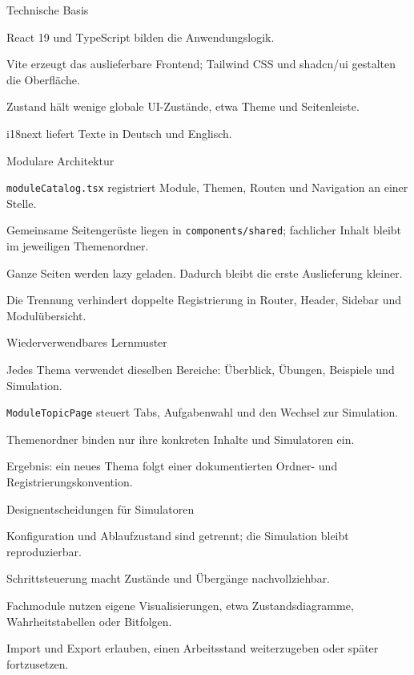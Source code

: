 
\begin{itemframe}{Technische Basis}
  \item React 19 und TypeScript bilden die Anwendungslogik.
  \item Vite erzeugt das auslieferbare Frontend; Tailwind CSS und shadcn/ui gestalten die Oberfläche.
  \item Zustand hält wenige globale UI-Zustände, etwa Theme und Seitenleiste.
  \item i18next liefert Texte in Deutsch und Englisch.
\end{itemframe}

\begin{itemframe}{Modulare Architektur}
  \item \texttt{moduleCatalog.tsx} registriert Module, Themen, Routen und Navigation an einer Stelle.
  \item Gemeinsame Seitengerüste liegen in \texttt{components/shared}; fachlicher Inhalt bleibt im jeweiligen Themenordner.
  \item Ganze Seiten werden lazy geladen. Dadurch bleibt die erste Auslieferung kleiner.
  \item Die Trennung verhindert doppelte Registrierung in Router, Header, Sidebar und Modulübersicht.
\end{itemframe}

\begin{itemframe}{Wiederverwendbares Lernmuster}
  \item Jedes Thema verwendet dieselben Bereiche: Überblick, Übungen, Beispiele und Simulation.
  \item \texttt{ModuleTopicPage} steuert Tabs, Aufgabenwahl und den Wechsel zur Simulation.
  \item Themenordner binden nur ihre konkreten Inhalte und Simulatoren ein.
  \item Ergebnis: ein neues Thema folgt einer dokumentierten Ordner- und Registrierungskonvention.
\end{itemframe}

\begin{itemframe}{Designentscheidungen für Simulatoren}
  \item Konfiguration und Ablaufzustand sind getrennt; die Simulation bleibt reproduzierbar.
  \item Schrittsteuerung macht Zustände und Übergänge nachvollziehbar.
  \item Fachmodule nutzen eigene Visualisierungen, etwa Zustandsdiagramme, Wahrheitstabellen oder Bitfolgen.
  \item Import und Export erlauben, einen Arbeitsstand weiterzugeben oder später fortzusetzen.
\end{itemframe}

